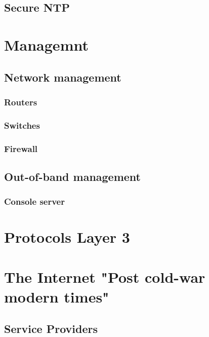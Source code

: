 \documentclass[a4paper,12pt,twoside,twocolumn,landscape]{book}
\begin{document}
\section{Secure NTP}

\chapter{Managemnt}

\section{Network management}

\subsection{Routers}

\subsection{Switches}

\subsection{Firewall}

\section{Out-of-band management}

\subsection{Console server}

\chapter{Protocols Layer 3}



\chapter{The Internet {\footnotesize "Post cold-war modern times"}}

\section{Service Providers}
\end{document}
